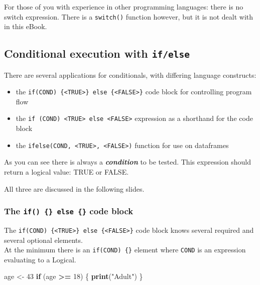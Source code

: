 \documentclass[]{book}
\newenvironment{Shaded}{\begin{snugshade}}{\end{snugshade}}
\newcommand{\ControlFlowTok}[1]{\textcolor[rgb]{0.13,0.29,0.53}{\textbf{#1}}}
\newcommand{\DecValTok}[1]{\textcolor[rgb]{0.00,0.00,0.81}{#1}}
\newcommand{\KeywordTok}[1]{\textcolor[rgb]{0.13,0.29,0.53}{\textbf{#1}}}
\newcommand{\NormalTok}[1]{#1}
\newcommand{\OperatorTok}[1]{\textcolor[rgb]{0.81,0.36,0.00}{\textbf{#1}}}
\newcommand{\StringTok}[1]{\textcolor[rgb]{0.31,0.60,0.02}{#1}}
\providecommand{\tightlist}{%
  \setlength{\itemsep}{0pt}\setlength{\parskip}{0pt}}
\begin{document}
For those of you with experience in other programming languages: there is no switch expression. There is a \texttt{switch()} function however, but it is not dealt with in this eBook.

\hypertarget{conditional-execution-with-ifelse}{%
\subsection{\texorpdfstring{Conditional execution with \texttt{if/else}}{Conditional execution with if/else}}\label{conditional-execution-with-ifelse}}

There are several applications for conditionals, with differing language constructs:

\begin{itemize}
\tightlist
\item
  the \texttt{if(COND)\ \{\textless{}TRUE\textgreater{}\}\ else\ \{\textless{}FALSE\textgreater{}\}} code block for controlling program flow
\item
  the \texttt{if\ (COND)\ \textless{}TRUE\textgreater{}\ else\ \textless{}FALSE\textgreater{}} expression as a shorthand for the code block
\item
  the \texttt{ifelse(COND,\ \textless{}TRUE\textgreater{},\ \textless{}FALSE\textgreater{})} function for use on dataframes
\end{itemize}

As you can see there is always a \textbf{\emph{condition}} to be tested. This expression should return a logical value: TRUE or FALSE.

All three are discussed in the following slides.

\hypertarget{the-if-else-code-block}{%
\subsubsection*{\texorpdfstring{The \texttt{if()\ \{\}\ else\ \{\}} code block}{The if() \{\} else \{\} code block}}\label{the-if-else-code-block}}

The \texttt{if(COND)\ \{\textless{}TRUE\textgreater{}\}\ else\ \{\textless{}FALSE\textgreater{}\}} code block knows several required and several optional elements.\\
At the minimum there is an \texttt{if(COND)\ \{\}} element where \texttt{COND} is an expression evaluating to a Logical.

\begin{Shaded}
\begin{Highlighting}[]
\NormalTok{age <-}\StringTok{ }\DecValTok{43}
\ControlFlowTok{if}\NormalTok{ (age }\OperatorTok{>=}\StringTok{ }\DecValTok{18}\NormalTok{) \{}
    \KeywordTok{print}\NormalTok{(}\StringTok{"Adult"}\NormalTok{)}
\NormalTok{\}}
\end{Highlighting}
\end{Shaded}
\end{document}
